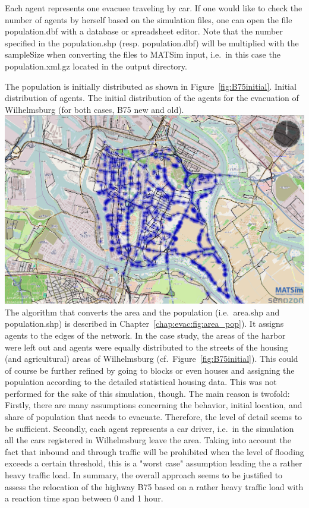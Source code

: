 Each agent represents one evacuee traveling by car. If one would like to check the number of agents by herself based on the simulation files, one can open the file population.dbf with a database or spreadsheet editor. Note that the number specified in the population.shp (resp. population.dbf) will be multiplied with the sampleSize when converting the files to MATSim input, i.e.\ in this case the population.xml.gz located in the output directory.

The population is initially distributed as shown in Figure~\ref{fig:B75initial}. 
%
\createfigure%
{Initial distribution of agents.}%
{The initial distribution of the agents for the evacuation of Wilhelmsburg (for both cases, B75 new and old).}%
{\label{fig:B75initial}}%
{\includegraphics[width=0.7\linewidth]{using/figures/B75initial}}%
{}
The algorithm that converts the area and the population (i.e.\ area.shp and population.shp) is described in Chapter~\ref{chap:evac:fig:area_pop}). It assigns agents to the edges of the network. In the case study, the areas of the harbor were left out and agents were equally distributed to the streets of the housing (and agricultural) areas of Wilhelmsburg (cf.\ Figure~\ref{fig:B75initial}).
This could of course be further refined by going to blocks or even houses and assigning the population according to the detailed statistical housing data. This was not performed for the sake of this simulation, though. The main reason is twofold: Firstly, there are many assumptions concerning the behavior, initial location, and share of population that needs to evacuate. Therefore, the level of detail seems to be sufficient. Secondly, each agent represents a car driver, i.e.\ in the simulation all the cars registered in Wilhelmsburg leave the area. Taking into account the fact that inbound and through traffic will be prohibited when the level of flooding exceeds a certain threshold, this is a "worst case" assumption leading the a rather heavy traffic load. In summary, the overall approach seems to be justified to assess the relocation of the highway B75 based on a rather heavy traffic load with a reaction time span between 0 and 1 hour.

